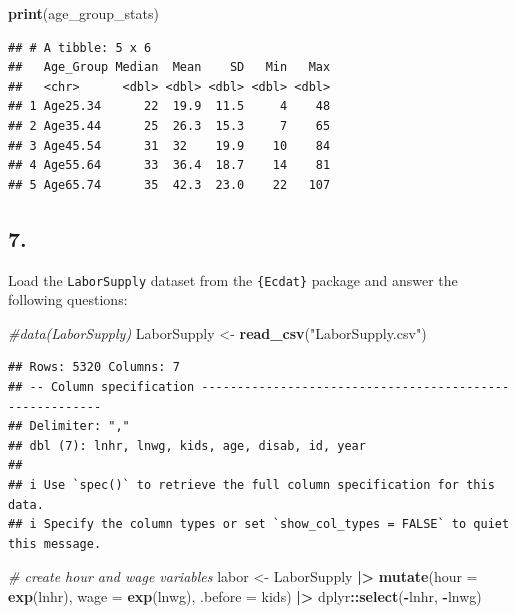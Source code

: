 \documentclass[
]{article}
\newenvironment{Shaded}{\begin{snugshade}}{\end{snugshade}}
\newcommand{\AttributeTok}[1]{\textcolor[rgb]{0.13,0.29,0.53}{#1}}
\newcommand{\CommentTok}[1]{\textcolor[rgb]{0.56,0.35,0.01}{\textit{#1}}}
\newcommand{\FunctionTok}[1]{\textcolor[rgb]{0.13,0.29,0.53}{\textbf{#1}}}
\newcommand{\NormalTok}[1]{#1}
\newcommand{\OtherTok}[1]{\textcolor[rgb]{0.56,0.35,0.01}{#1}}
\newcommand{\SpecialCharTok}[1]{\textcolor[rgb]{0.81,0.36,0.00}{\textbf{#1}}}
\newcommand{\StringTok}[1]{\textcolor[rgb]{0.31,0.60,0.02}{#1}}
\begin{document}
\begin{Shaded}
\begin{Highlighting}[]
\FunctionTok{print}\NormalTok{(age\_group\_stats)}
\end{Highlighting}
\end{Shaded}

\begin{verbatim}
## # A tibble: 5 x 6
##   Age_Group Median  Mean    SD   Min   Max
##   <chr>      <dbl> <dbl> <dbl> <dbl> <dbl>
## 1 Age25.34      22  19.9  11.5     4    48
## 2 Age35.44      25  26.3  15.3     7    65
## 3 Age45.54      31  32    19.9    10    84
## 4 Age55.64      33  36.4  18.7    14    81
## 5 Age65.74      35  42.3  23.0    22   107
\end{verbatim}

\subsection{7.}\label{section-6}

Load the \texttt{LaborSupply} dataset from the \texttt{\{Ecdat\}}
package and answer the following questions:

\begin{Shaded}
\begin{Highlighting}[]
\CommentTok{\#data(LaborSupply)}
\NormalTok{LaborSupply }\OtherTok{\textless{}{-}} \FunctionTok{read\_csv}\NormalTok{(}\StringTok{"LaborSupply.csv"}\NormalTok{)}
\end{Highlighting}
\end{Shaded}

\begin{verbatim}
## Rows: 5320 Columns: 7
## -- Column specification --------------------------------------------------------
## Delimiter: ","
## dbl (7): lnhr, lnwg, kids, age, disab, id, year
## 
## i Use `spec()` to retrieve the full column specification for this data.
## i Specify the column types or set `show_col_types = FALSE` to quiet this message.
\end{verbatim}

\begin{Shaded}
\begin{Highlighting}[]
\CommentTok{\# create hour and wage variables}
\NormalTok{labor }\OtherTok{\textless{}{-}}\NormalTok{ LaborSupply }\SpecialCharTok{|\textgreater{}} 
  \FunctionTok{mutate}\NormalTok{(}\AttributeTok{hour =} \FunctionTok{exp}\NormalTok{(lnhr), }\AttributeTok{wage =} \FunctionTok{exp}\NormalTok{(lnwg), }\AttributeTok{.before =}\NormalTok{ kids) }\SpecialCharTok{|\textgreater{}} 
\NormalTok{  dplyr}\SpecialCharTok{::}\FunctionTok{select}\NormalTok{(}\SpecialCharTok{{-}}\NormalTok{lnhr, }\SpecialCharTok{{-}}\NormalTok{lnwg)}
\end{Highlighting}
\end{Shaded}
\end{document}
